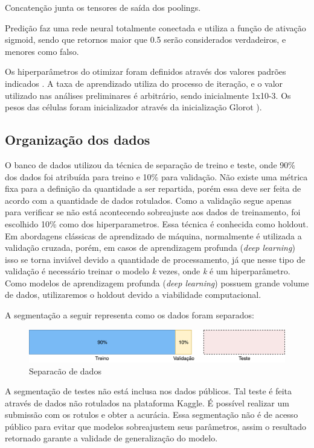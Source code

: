 \documentclass[12pt]{article}
\begin{document}
Concatenção junta os tensores de saída dos poolings.

Predição faz uma rede neural totalmente conectada e utiliza a função de ativação sigmoid, sendo que retornos maior que 0.5 serão considerados verdadeiros, e menores como falso.

Os hiperparâmetros do otimizar foram definidos através dos valores padrões indicados \cite{DBLP:journals/corr/KingmaB14}. A taxa de aprendizado utiliza do processo de iteração, e o valor utilizado nas análises preliminares é arbitrário, sendo inicialmente 1x10-3. Os pesos das células foram inicializador através da inicialização Glorot \cite{glorot:10}).

\subsection{Organização dos dados}

O banco de dados utilizou da técnica de separação de treino e teste, onde 90\% dos dados foi atribuída para treino e 10\% para validação. Não existe uma métrica fixa para a definição da quantidade a ser repartida, porém essa deve ser feita de acordo com a quantidade de dados rotulados. Como a validação segue apenas para verificar se não está acontecendo sobreajuste aos dados de treinamento, foi escolhido 10\% como dos hiperparametros. Essa técnica é conhecida como holdout. Em abordagens clássicas de aprendizado de máquina, normalmente é utilizada a validação cruzada, porém, em casos de aprendizagem profunda (\textit{deep learning}) isso se torna inviável devido a quantidade de processamento, já que nesse tipo de validação é necessário treinar o modelo \textit{k} vezes, onde \textit{k} é um hiperparâmetro. Como modelos de aprendizagem profunda (\textit{deep learning}) possuem grande volume de dados, utilizaremos o holdout devido a viabilidade computacional.

A segmentação a seguir representa como os dados foram separados:

\begin{figure}[!htb]
\centering
\includegraphics[width=1\textwidth]{images/datasplit.png}
\caption{Separacão de dados}
\label{fig:datasplit}
\end{figure}

A segmentação de testes não está inclusa nos dados públicos. Tal teste é feita através de dados não rotulados na plataforma Kaggle. É possível realizar um submissão com os rotulos e obter a acurácia. Essa segmentação não é de acesso público para evitar que modelos sobreajustem seus parâmetros, assim o resultado retornado garante a validade de generalização do modelo.
\end{document}
